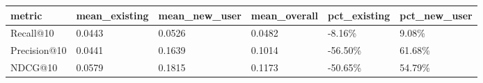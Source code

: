 \begin{tabular}{llllll}
\toprule
metric & mean_existing & mean_new_user & mean_overall & pct_existing & pct_new_user \\
\midrule
Recall@10 & 0.0443 & 0.0526 & 0.0482 & -8.16\% & 9.08\% \\
Precision@10 & 0.0441 & 0.1639 & 0.1014 & -56.50\% & 61.68\% \\
NDCG@10 & 0.0579 & 0.1815 & 0.1173 & -50.65\% & 54.79\% \\
\bottomrule
\end{tabular}
